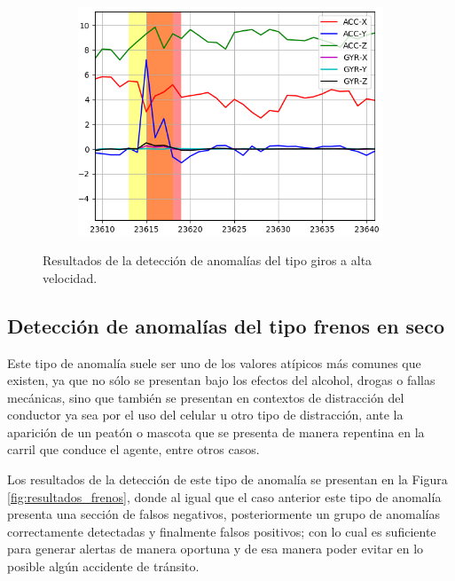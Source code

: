 \begin{figure}[H]
{\begin{varwidth}{\textwidth}
\begin{subfigure}[h]{0.45\textwidth}
            \includegraphics[width=\textwidth]{imagenes/Cap5/giro3}
        \end{subfigure} 
        \end{varwidth}}
        \caption{Resultados de la detecci\'{o}n de anomal\'{i}as del tipo giros a alta velocidad.}
		\label{fig:resultados_giros}
    \end{figure}

\subsection{Detecci\'{o}n de anomal\'{i}as del tipo frenos en seco}

Este tipo de anomal\'{i}a suele ser uno de los valores at\'{i}picos m\'{a}s comunes que existen, ya que no s\'{o}lo se presentan bajo los efectos del alcohol, drogas o fallas mec\'{a}nicas, sino que tambi\'{e}n se presentan en contextos de distracci\'{o}n del conductor ya sea por el uso del celular u otro tipo de distracci\'{o}n, ante la aparici\'{o}n de un peat\'{o}n o mascota que se presenta de manera repentina en la carril que conduce el agente, entre otros casos.

\vspace{5mm} %

Los resultados de la detecci\'{o}n de este tipo de anomal\'{i}a se presentan en la Figura \ref{fig:resultados_frenos}, donde al igual que el caso anterior este tipo de anomal\'{i}a presenta una secci\'{o}n de falsos negativos, posteriormente un grupo de anomal\'{i}as correctamente detectadas y finalmente falsos positivos; con lo cual es suficiente para generar alertas de manera oportuna y de esa manera poder evitar en lo posible alg\'{u}n accidente de tr\'{a}nsito.

